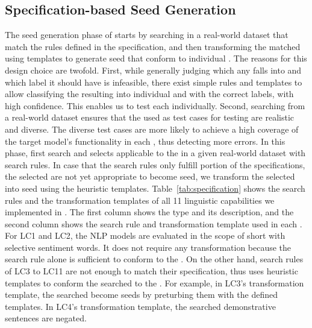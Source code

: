 \subsection{Specification-based Seed Generation}
The seed generation phase of \tool starts by searching \sents in a
real-world dataset that match the rules defined in the \lc
specification, and then transforming the matched \sents using
templates to generate seed \sents that conform to individual \lcs. The
reasons for this design choice are twofold.  First, while generally
judging which \lc any \sent falls into and which label it should have
is infeasible, there exist simple rules and templates to allow
classifying the resulting \sents into individual \lcs and with the
correct labels, with high confidence.  This enables us to test each
\lc individually.  Second, searching from a real-world dataset ensures
that the \sents used as test cases for testing \lcs are realistic and
diverse. The diverse test cases are more likely to achieve a high
coverage of the target model's functionality in each \lc, thus
detecting more errors.
%
In this phase, \tool first search and selects \sents applicable to the
\lc in a given real-world dataset with search rules. In case that the
search rules only fulfill portion of the \lc specifications, the
selected \sents are not yet appropriate to become seed, we transform
the selected \sents into seed \sents using the heuristic templates.
%
Table~\ref{tab:specification} shows the search rules and the
transformation templates of all 11 linguistic capabilities we
implemented in \tool. The first column shows the \lc type and its
description, and the second column shows the search rule and
transformation template used in each \lc. For LC1 and LC2, the NLP
models are evaluated in the scope of short \sents with selective
sentiment words. It does not require any transformation because the
search rule alone is sufficient to conform to the \lcs. On the other
hand, search rules of LC3 to LC11 are not enough to match their \lc
specification, thus \tool uses heuristic templates to conform the
searched \sents to the \lc. For example, in LC3's transformation
template, the searched \sents become seeds by preturbing them with the
defined templates.  In LC4's transformation template, the searched
demonstrative sentences are negated.

